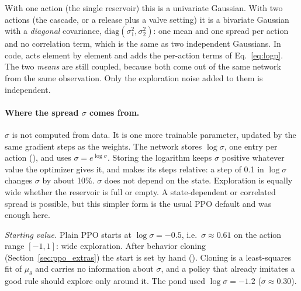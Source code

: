 With one action (the single reservoir) this is a univariate Gaussian. With
two actions (the cascade, or a release plus a valve setting) it is a
bivariate Gaussian with a \emph{diagonal} covariance,
$\mathrm{diag}(\sigma_1^2,\sigma_2^2)$: one mean and one spread per
action and no correlation term, which is the same as two independent
Gaussians. In code, 
acts element by element and  adds the
per-action terms of Eq.~\eqref{eq:logp}. The two \emph{means} are still
coupled, because both come out of the same network from the same
observation. Only the exploration noise added to them is independent.

\paragraph{Where the spread $\sigma$ comes from.}
$\sigma$ is not computed from data. It is one more trainable parameter,
updated by the same gradient steps as the weights. The network stores
$\log\sigma$, one entry per action
(), and
uses $\sigma=e^{\log\sigma}$. Storing the logarithm keeps $\sigma$
positive whatever value the optimizer gives it, and makes its steps
relative: a step of 0.1 in $\log\sigma$ changes $\sigma$ by about 10\%.
$\sigma$ does not depend on the state. Exploration is equally wide whether
the reservoir is full or empty. A state-dependent or correlated spread is
possible, but this simpler form is the usual PPO default and was enough
here.

\emph{Starting value.} Plain PPO starts at $\log\sigma=-0.5$, i.e.\
$\sigma\approx0.61$ on the action range $[-1,1]$: wide exploration. After
behavior cloning (Section~\ref{sec:ppo_extras}) the start is set by hand
(\code{--bc-log-std}). Cloning is a least-squares fit of $\mu_\theta$ and
carries no information about $\sigma$, and a policy that already
imitates a good rule should explore only around it. The pond used
$\log\sigma=-1.2$ ($\sigma\approx0.30$).

